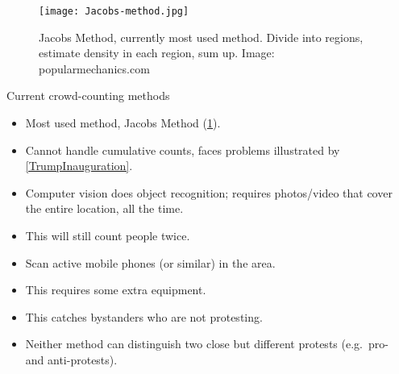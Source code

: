 \begin{columns}[t]

  \begin{column}{0.32\linewidth}

    \begin{figure}
      \centering
      \texttt{[image: Jacobs-method.jpg]}
      \caption{%
        Jacobs Method, currently most used method.
        Divide into regions, estimate density in each region, sum up.
        Image: popularmechanics.com
      }\label{JacobsMethod}
    \end{figure}

    \begin{purpleblock}{Current crowd-counting methods}
      \begin{itemize}
        \item Most used method, Jacobs Method (\cref{JacobsMethod}).
        \item {\color{red} Cannot handle cumulative counts, faces problems 
            illustrated by \cref{TrumpInauguration}.}
        \item Computer vision does object recognition; requires photos/video 
          that cover the entire location, all the time.
        \item {\color{red} This will still count people twice.}
        \item Scan active mobile phones (or similar) in the area.
        \item This requires some extra equipment.
        \item {\color{red} This catches bystanders who are not protesting.}
        \item {\color{red} Neither method can distinguish two close but 
            different protests (e.g.\ pro- and anti-protests).}
      \end{itemize}
    \end{purpleblock}

  \end{column}

  \hfill

  \begin{column}{0.32\linewidth}


\end{column}
\end{columns}
